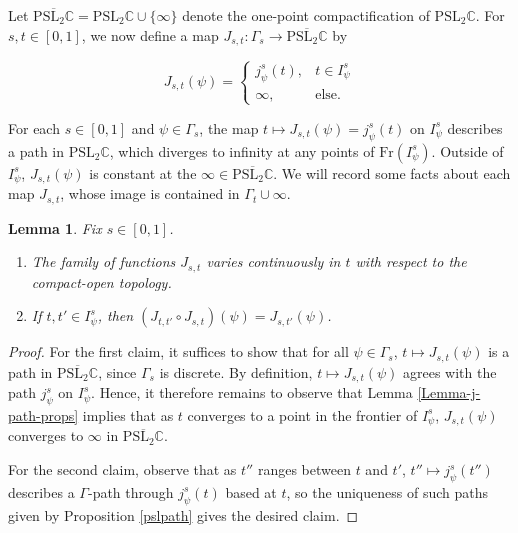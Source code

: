 \documentclass[11pt,leqno]{article}
\newtheorem{lemma}{Lemma}
\theoremstyle{introdef}
\numberwithin{lemma}{section}
\theoremstyle{definition}
\newcommand{\C}{\mathbb{C}}
\begin{document}
Let $\overline{\mathrm{PSL}_2\C}=\mathrm{PSL}_2\C\cup\{\infty\}$ denote the one-point compactification of $\mathrm{PSL}_2\C$. For $s,t\in[0,1]$, we now define a map $J_{s,t}:\Gamma_s\rightarrow\overline{\mathrm{PSL}_2\C}$ by 


\begin{equation}
\label{eqn-JDef}
    J_{s,t}(\psi)=
\begin{cases} 
      j_\psi^s(t), & t\in I_\psi^s \\
      \infty, & \text{else}.
   \end{cases}
\end{equation}

For each $s\in[0,1]$ and $\psi\in\Gamma_s$, the map $t\mapsto J_{s,t}(\psi)=j_\psi^s(t)$ on $I_\psi^s$ describes a path in $\mathrm{PSL}_2\C$, which diverges to infinity at any points of $\mathrm{Fr}(I_\psi^s)$. Outside of $I_\psi^s$, $J_{s,t}(\psi)$ is constant at the $\infty\in\overline{\mathrm{PSL}_2\C}$. We will record some facts about each map $J_{s,t}$, whose image is contained in $\Gamma_t\cup\infty$. 


\begin{lemma}
\label{Lemma-JFacts}
    Fix $s\in[0,1]$.
    \begin{enumerate}
        \item The family of functions $J_{s,t}$ varies continuously in $t$ with respect to the compact-open topology.
        \item If $t,t'\in I_\psi^s$, then $(J_{t,t'}\circ J_{s,t})(\psi)=J_{s,t'}(\psi)$.
    \end{enumerate}
\end{lemma}
\begin{proof}
    For the first claim, it suffices to show that for all $\psi\in\Gamma_s$, $t\mapsto J_{s,t}(\psi)$ is a path in $\overline{\mathrm{PSL}_2\C}$, since $\Gamma_s$ is discrete. By definition, $t\mapsto J_{s,t}(\psi)$ agrees with the path $j_\psi^s$ on $I_\psi^s$. Hence, it therefore remains to observe that Lemma \ref{Lemma-j-path-props} implies that as $t$ converges to a point in the frontier of $I_\psi^s$, $J_{s,t}(\psi)$ converges to $\infty$ in $\overline{\mathrm{PSL}_2\C}$.\par
    
    For the second claim, observe that as $t''$ ranges between $t$ and $t'$, $t''\mapsto j_\psi^s(t'')$ describes a $\Gamma$-path through $j_\psi^s(t)$ based at $t$, so the uniqueness of such paths given by Proposition \ref{pslpath} gives the desired claim.
\end{proof}
\end{document}
